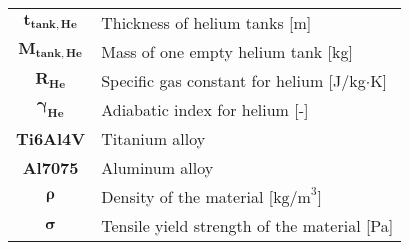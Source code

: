 \begin{multicols}{2}
{\begin{xltabular}{\linewidth}{c>{\raggedright\arraybackslash}X}
		$\boldsymbol{t_{tank,He}}$ & Thickness of helium tanks [m] \\
		$\boldsymbol{M_{tank,He}}$ & Mass of one empty helium tank [kg] \\
		$\boldsymbol{R_{He}}$ & Specific gas constant for helium [J/kg$\cdot$K] \\
		$\boldsymbol{\gamma_{He}}$ & Adiabatic index for helium [-] \\
		\textbf{Ti6Al4V} & Titanium alloy \\
		\textbf{Al7075} & Aluminum alloy \\
		$\boldsymbol{\rho}$ & Density of the material [$\textrm{kg/m}^3$] \\
		$\boldsymbol{\sigma}$ & Tensile yield strength of the material [Pa]
	\end{xltabular}
	\unskip
	\unpenalty
	\unpenalty}
	\unvbox\ltmcbox
\end{multicols}